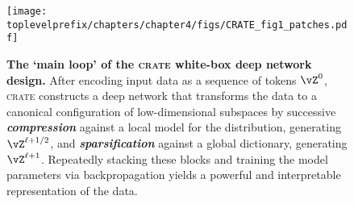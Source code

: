 \documentclass[../../book-main.tex]{subfiles}
\begin{document}
\begin{figure}[t!]
     \centering
         \texttt{[image: \\toplevelprefix/chapters/chapter4/figs/CRATE\_fig1\_patches.pdf]}
     \vspace{-0.1in}
     \caption{
     \textbf{The `main loop' of the \textsc{crate} white-box deep network design.} 
     After encoding input data as a sequence of tokens $\vZ^0$, \textsc{crate} constructs a deep network that transforms the data to a canonical configuration of low-dimensional subspaces by successive   {\textit{\textbf{compression}}} 
     against a local model for the distribution, generating $\vZ^{\ell+1/2}$, and      {\textit{\textbf{sparsification}}} 
     against a global dictionary, generating $\vZ^{\ell+1}$. 
     Repeatedly stacking these blocks and training the model parameters via backpropagation yields a powerful and interpretable representation of the data.
     }
        \label{fig:crate-diagram}
\end{figure}
\end{document}

